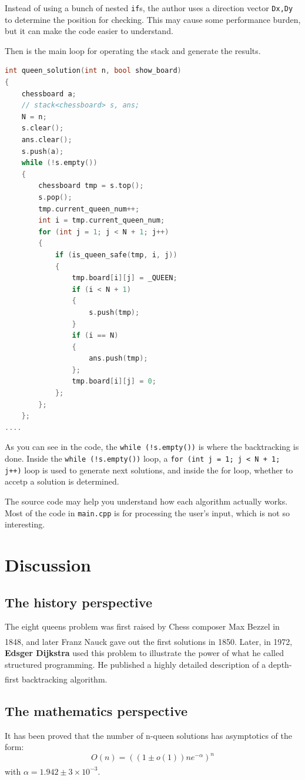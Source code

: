 \documentclass[cn,black,12pt,normal]{elegantnote}
\newcommand{\uct}[1]{\textsuperscript{\textsuperscript{\cite{#1}}}}
\begin{document}
Instead of using a bunch of nested \lstinline{if}s, the author uses a direction vector \lstinline{Dx,Dy} to determine the position for checking. This may cause some performance burden, but it can make the code easier to understand.

Then is the main loop for operating the stack and generate the results.

\begin{lstlisting}[language = C++]
int queen_solution(int n, bool show_board)
{
	chessboard a;
    // stack<chessboard> s, ans;
	N = n;
	s.clear();
	ans.clear();
	s.push(a);
	while (!s.empty())
	{
		chessboard tmp = s.top();
		s.pop();
		tmp.current_queen_num++;
		int i = tmp.current_queen_num;
		for (int j = 1; j < N + 1; j++)
		{
			if (is_queen_safe(tmp, i, j))
			{
				tmp.board[i][j] = _QUEEN;
				if (i < N + 1)
				{
					s.push(tmp);
				}
				if (i == N)
				{
					ans.push(tmp);
				};
				tmp.board[i][j] = 0;
			};
		};
	};
....
\end{lstlisting}
As you can see in the code, the \lstinline{while (!s.empty())} is where the backtracking is done. Inside the \lstinline{while (!s.empty())} loop, a \lstinline{for (int j = 1; j < N + 1; j++)} loop is used to generate next solutions, and inside the for loop, whether to accetp a solution is determined.

The source code may help you understand how each algorithm actually works. Most of the code in \lstinline{main.cpp} is for processing the user's input, which is not so interesting.

\section{Discussion}

\subsection{The history perspective}
The eight queens problem was first raised by Chess composer Max Bezzel in 1848, and later Franz Nauck gave out the first solutions in 1850.\uct{rouse1960eight} Later, in 1972, \textbf{Edsger Dijkstra} used this problem to illustrate the power of what he called structured programming. He published a highly detailed description of a depth-first backtracking algorithm. \uct{wiki:Eight_queens_puzzle}

\subsection{The mathematics perspective}
It has been proved that the number of n-queen solutions has asymptotics of the form:
\begin{equation}
    O(n) = ((1\pm o(1))ne^{-\alpha})^n
\end{equation}
with $\alpha = 1.942 \pm 3 \times 10^{-3}$\uct{simkin2021number}.
\end{document}
